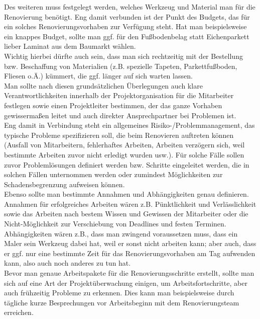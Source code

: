 \documentclass{swp1}
\begin{document}
Des weiteren muss festgelegt werden, welches Werkzeug und Material man für die Renovierung benötigt. Eng damit verbunden ist der Punkt des Budgets, das für ein solches Renovierungsvorhaben zur Verfügung steht. Hat man beispielsweise ein knappes Budget, sollte man ggf. für den Fußbodenbelag statt Eichenparkett lieber Laminat aus dem Baumarkt wählen. \\
Wichtig hierbei dürfte auch sein, dass man sich rechtzeitig mit der Bestellung bzw. Beschaffung von Materialien (z.B. spezielle Tapeten, Parkettfußboden, Fliesen o.Ä.) kümmert, die ggf. länger auf sich warten lassen.\\

Man sollte nach diesen grundsätzlichen Überlegungen auch klare Verantwortlichkeiten innerhalb der Projektorganisation für die Mitarbeiter festlegen sowie einen Projektleiter bestimmen, der das ganze Vorhaben gewissermaßen leitet und auch direkter Ansprechpartner bei Problemen ist.\\

Eng damit in Verbindung steht ein allgemeines Risiko-/Problemmanagement, das typische Probleme spezifizieren soll, die beim Renovieren auftreten können (Ausfall von Mitarbeitern, fehlerhaftes Arbeiten, Arbeiten verzögern sich, weil bestimmte Arbeiten zuvor nicht erledigt wurden usw.). Für solche Fälle sollen zuvor Problemlösungen definiert werden bzw. Schritte eingeleitet werden, die in solchen Fällen unternommen werden oder zumindest Möglichkeiten zur Schadensbegrenzung aufweisen können.\\

Ebenso sollte man bestimmte Annahmen und Abhängigkeiten genau definieren. Annahmen für erfolgreiches Arbeiten wären z.B. Pünktlichkeit und Verlässlichkeit sowie das Arbeiten nach bestem Wissen und Gewissen der Mitarbeiter oder die Nicht-Möglichkeit zur Verschiebung von Deadlines und festen Terminen.\\
Abhängigkeiten wären z.B., dass man zwingend voraussetzen muss, dass ein Maler sein Werkzeug dabei hat, weil er sonst nicht arbeiten kann; aber auch, dass er ggf. nur eine bestimmte Zeit für das Renovierungsvorhaben am Tag aufwenden kann, also auch noch anderes zu tun hat.\\

Bevor man genaue Arbeitspakete für die Renovierungsschritte erstellt, sollte man sich auf eine Art der Projektüberwachung einigen, um Arbeitsfortschritte, aber auch frühzeitig Probleme zu erkennen. Dies kann man beispielsweise durch tägliche kurze Besprechungen vor Arbeitsbeginn mit dem Renovierungsteam erreichen. \\
\end{document}
